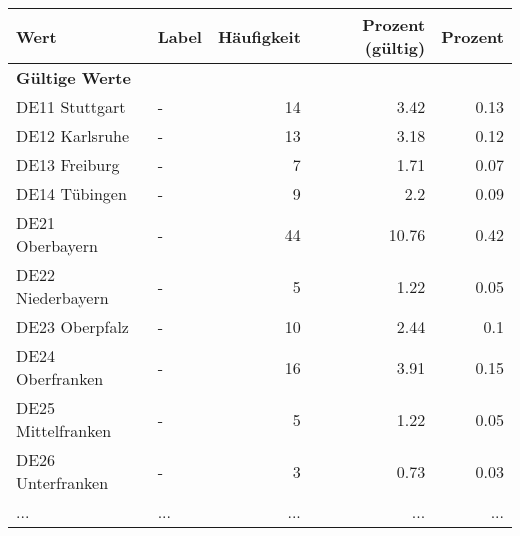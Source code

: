      \begin{longtable}{Xlrrr}
     \toprule
     \textbf{Wert} & \textbf{Label} & \textbf{Häufigkeit} & \textbf{Prozent (gültig)} & \textbf{Prozent} \\
     \endhead
     \midrule
     \multicolumn{5}{l}{\textbf{Gültige Werte}}\\
        \multicolumn{1}{X}{DE11 Stuttgart} & - & \num{14} & \num[round-mode=places,round-precision=2]{3.42} & \num[round-mode=places,round-precision=2]{0.13} \\
        \multicolumn{1}{X}{DE12 Karlsruhe} & - & \num{13} & \num[round-mode=places,round-precision=2]{3.18} & \num[round-mode=places,round-precision=2]{0.12} \\
        \multicolumn{1}{X}{DE13 Freiburg} & - & \num{7} & \num[round-mode=places,round-precision=2]{1.71} & \num[round-mode=places,round-precision=2]{0.07} \\
        \multicolumn{1}{X}{DE14 Tübingen} & - & \num{9} & \num[round-mode=places,round-precision=2]{2.2} & \num[round-mode=places,round-precision=2]{0.09} \\
        \multicolumn{1}{X}{DE21 Oberbayern} & - & \num{44} & \num[round-mode=places,round-precision=2]{10.76} & \num[round-mode=places,round-precision=2]{0.42} \\
        \multicolumn{1}{X}{DE22 Niederbayern} & - & \num{5} & \num[round-mode=places,round-precision=2]{1.22} & \num[round-mode=places,round-precision=2]{0.05} \\
        \multicolumn{1}{X}{DE23 Oberpfalz} & - & \num{10} & \num[round-mode=places,round-precision=2]{2.44} & \num[round-mode=places,round-precision=2]{0.1} \\
        \multicolumn{1}{X}{DE24 Oberfranken} & - & \num{16} & \num[round-mode=places,round-precision=2]{3.91} & \num[round-mode=places,round-precision=2]{0.15} \\
        \multicolumn{1}{X}{DE25 Mittelfranken} & - & \num{5} & \num[round-mode=places,round-precision=2]{1.22} & \num[round-mode=places,round-precision=2]{0.05} \\
        \multicolumn{1}{X}{DE26 Unterfranken} & - & \num{3} & \num[round-mode=places,round-precision=2]{0.73} & \num[round-mode=places,round-precision=2]{0.03} \\
       ... & ... & ... & ... & ... \\

\end{longtable}
